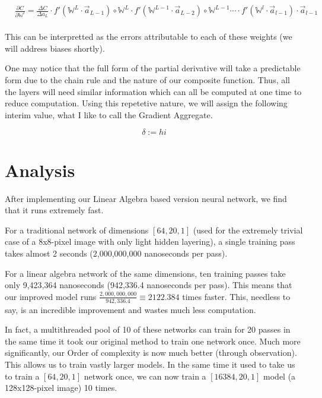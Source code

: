 \documentclass[8pt]{amsart}
\newcommand\mat[1]{\mathbb{#1}}
\begin{document}
\[
    \begin{aligned}
        & \frac{ \partial C }{ \partial \mat{W}^l } = \frac{ \Delta C }{ \Delta a_L }
            \cdot
                f'(\mat{W}^L \cdot \vec{a}_{L - 1}) \circ \mat{W}^L
            \cdot
                f'(\mat{W}^{L - 1} \cdot \vec{a}_{L - 2}) \circ \mat{W}^{L - 1}
            \cdots
            \cdot
                f'(\mat{W}^l \cdot \vec{a}_{l - 1}) \cdot \vec{a}_{l - 1} \\
    \end{aligned}
\]

This can be interpretted as the errors attributable to each of these weights (we will
address biases shortly).

One may notice that the full form of the partial derivative will take a
predictable form due to the chain rule and the nature of our composite function.
Thus, all the layers will need similar information which can all be computed
at one time to reduce computation. Using this repetetive nature, we will assign
the following interim value, what I like to call the Gradient Aggregate.

\[
    \delta := hi
\]

\section{Analysis}

After implementing our Linear Algebra based version neural network, we find that
it runs extremely fast.

For a traditional network of dimensions $[64, 20, 1]$ (used for the extremely
trivial case of a 8x8-pixel image with only light hidden layering), a single training
pass takes almost 2 seconds (2,000,000,000 nanoseconds per pass).

For a linear algebra network of the same dimensions, ten training passes take only
9,423,364 nanoseconds (942,336.4 nanoseconds per pass). This means that our improved
model runs $\frac{2,000,000,000}{942,336.4} \equiv 2122.384$ times faster. This, needless
to say, is an incredible improvement and wastes much less computation.

In fact, a multithreaded pool of 10 of these networks can train for 20 passes in the
same time it took our original method to train one network once. Much more significantly,
our Order of complexity is now much better (through observation). This allows us to
train vastly larger models. In the same time it used to take us to train a $[64, 20, 1]$
network once, we can now train a $[16384, 20, 1]$ model (a 128x128-pixel image) 10 times.
\end{document}

